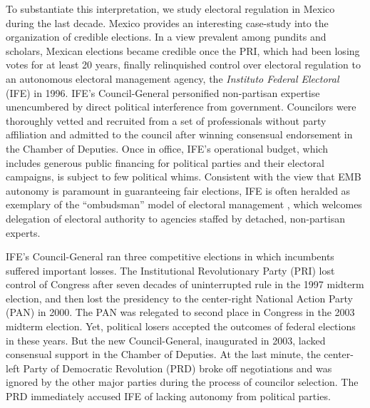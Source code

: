 \documentclass[12 pt, letter]{article}
\renewcommand{\footnote}{\endnote}
\begin{document}
To substantiate this interpretation, we study electoral regulation in Mexico during the last decade.  Mexico provides an interesting case-study into the organization of credible elections.  In a view prevalent among pundits and scholars, Mexican elections became credible once the PRI, which had been losing votes for at least 20 years, finally relinquished control over electoral regulation to an autonomous electoral management agency, the \emph{Instituto Federal Electoral} (IFE) in 1996. IFE's Council-General personified non-partisan expertise unencumbered by direct political interference from government.  Councilors were thoroughly vetted and recruited from a set of professionals without party affiliation and admitted to the council after winning consensual endorsement in the Chamber of Deputies.  Once in office, IFE's operational budget, which includes generous public financing for political parties and their electoral campaigns, is subject to few political whims.  Consistent with the view that EMB autonomy is paramount in guaranteeing fair elections, IFE is often heralded as exemplary of the ``ombudsman'' model of electoral management \citep{Eisenstadt2004}, which welcomes delegation of electoral authority to agencies staffed by detached, non-partisan experts.

IFE's Council-General ran three competitive elections in which incumbents suffered important losses. The Institutional Revolutionary Party (PRI) lost control of Congress after seven decades of uninterrupted rule in the 1997 midterm election, and then lost the presidency to the center-right National Action Party (PAN) in 2000. The PAN was relegated to second place in Congress in the 2003 midterm election. Yet, political losers accepted the outcomes of federal elections in these years.  But the new Council-General, inaugurated in 2003, lacked consensual support in the Chamber of Deputies.  At the last minute, the center-left Party of Democratic Revolution (PRD) broke off negotiations and was ignored by the other major parties during the process of  councilor selection.  The PRD immediately accused IFE of lacking autonomy from political parties.%
\end{document}
